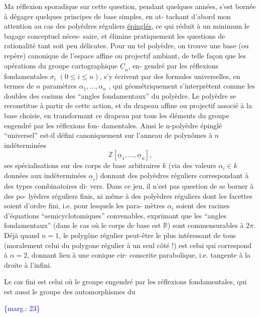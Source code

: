 \documentclass[11pt]{article}
\newcommand{\scanpage}[1]{\par\bigskip\noindent{\small\sffamily[scan #1]}\par}
\newcommand{\mspage}[1]{{\small\sffamily[p.\,#1]}}
\newcommand{\margin}[1]{\textcolor{blue}{\{\textsf{marg.:} #1\}}}
\newcommand{\uline}[1]{\underline{#1}}
\begin{document}
Ma réflexion sporadique sur cette question, pendant quelques années,
s'est bornée à dégager quelques principes de base simples, en at-%
tachant d'abord mon attention au cas des polyèdres réguliers
\uline{épinglés}, ce qui réduit à un minimum le bagage conceptuel néces-%
saire, et élimine pratiquement les questions de rationalité tant
soit peu délicates. Pour un tel polyèdre, on trouve une base (ou
repère) canonique de l'espace affine ou projectif ambiant, de
telle façon que les opérations du groupe cartographique $\underline{C}_n$, en-%
gendré par les réflexions fondamentales $\sigma_i$ $(0 \leq i \leq n)$, s'y
écrivent par des formules universelles, en termes de $n$ paramètres
$\alpha_1,\ldots,\alpha_n$ , qui géométriquement s'interprètent comme les doubles
des cosinus des ``angles fondamentaux'' du polyèdre. Le polyèdre se
reconstitue à partir de cette action, et du drapeau affine ou
projectif associé à la base choisie, en transformant ce drapeau
par tous les éléments du groupe engendré par les réflexions fon-%
damentales. Ainsi le n-polyèdre épinglé ``universel'' est-il défini
canoniquement sur l'anneau de polynômes à $n$ indéterminées
\[ \mathbb{Z}[\underline{\alpha}_1,\ldots,\underline{\alpha}_n] , \]
ses spécialisations sur des corps de base arbitraires $k$ (via
des valeurs $\alpha_i \in k$ données aux indéterminées $\underline{\alpha}_i$) donnant des
polyèdres réguliers correspondant à des types combinatoires di-%
vers. Dans ce jeu, il n'est pas question de se borner à des po-%
lyèdres réguliers finis, ni même à des polyèdres réguliers dont
les facettes soient d'ordre fini, i.e. pour lesquels les para-%
mètres $\alpha_i$ soient des racines d'équations ``semicyclotomiques''
convenables, exprimant que les ``angles fondamentaux'' (dans le
cas où le corps de base est $\mathbb{R}$) sont commensurables à $2\pi$. Déjà
quand $n = 1$, le polygône régulier peut-être le plus intéressant
de tous (moralement celui du polygone régulier à un seul côté !)
est celui qui correspond à $\alpha = 2$, donnant lieu à une conique cir-%
conscrite parabolique, i.e. tangente à la droite à l'infini.

Le cas fini est celui où le groupe engendré par les réflexions
fondamentales, qui est aussi le groupe des automorphismes du

\margin{23}

\clearpage
\scanpage{119/24}
\mspage{22}
\end{document}
